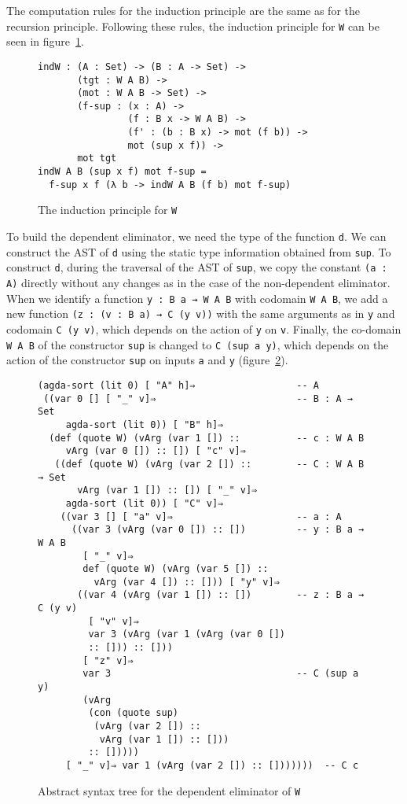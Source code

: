 \documentclass[sigplan,10pt]{acmart}
\begin{document}
The computation rules for the induction principle are the same as for the recursion principle.
Following these rules, the induction principle for \texttt{W} can be seen in figure~\ref{fig:w-ind}.

\begin{figure}
\begin{Verbatim}
indW : (A : Set) -> (B : A -> Set) ->
       (tgt : W A B) ->
       (mot : W A B -> Set) ->
       (f-sup : (x : A) ->
                (f : B x -> W A B) ->
                (f' : (b : B x) -> mot (f b)) ->
                mot (sup x f)) ->
       mot tgt
indW A B (sup x f) mot f-sup =
  f-sup x f (λ b -> indW A B (f b) mot f-sup)
\end{Verbatim}
  \caption{The induction principle for \texttt{W}}
  \label{fig:w-ind}
\end{figure}

To build the dependent eliminator, we need the type of the function {\tt d}. We can construct the AST of {\tt d} using the static type information obtained from {\tt sup}. To construct {\tt d}, during the traversal of the AST of {\tt sup}, we copy the constant {\tt (a : A)} directly without any changes as in the case of the non-dependent eliminator. When we identify a function {\tt y : B a → W A B} with codomain {\tt W A B}, we add a new function {\tt (z : (v : B a) → C (y v))} with the same arguments as in {\tt y} and codomain {\tt C (y v)}, which depends on the action of {\tt y} on {\tt v}. Finally, the co-domain \texttt{W A B} of the constructor {\tt sup} is changed to {\tt C (sup a y)}, which depends on the action of the constructor {\tt sup} on inputs {\tt a} and {\tt y} (figure~\ref{fig:ast-d'}).

\begin{figure}
\begin{center}
\begingroup
\fontsize{7pt}{9pt}\selectfont
\begin{Verbatim}
(agda-sort (lit 0) [ "A" h]⇒                  -- A
 ((var 0 [] [ "_" v]⇒                         -- B : A → Set
     agda-sort (lit 0)) [ "B" h]⇒
  (def (quote W) (vArg (var 1 []) ::          -- c : W A B
     vArg (var 0 []) :: []) [ "c" v]⇒
   ((def (quote W) (vArg (var 2 []) ::        -- C : W A B → Set
       vArg (var 1 []) :: []) [ "_" v]⇒
     agda-sort (lit 0)) [ "C" v]⇒
    ((var 3 [] [ "a" v]⇒                      -- a : A
      ((var 3 (vArg (var 0 []) :: [])         -- y : B a → W A B
        [ "_" v]⇒
        def (quote W) (vArg (var 5 []) :: 
          vArg (var 4 []) :: [])) [ "y" v]⇒
       ((var 4 (vArg (var 1 []) :: [])        -- z : B a → C (y v)
         [ "v" v]⇒
         var 3 (vArg (var 1 (vArg (var 0 []) 
         :: [])) :: []))
        [ "z" v]⇒
        var 3                                 -- C (sup a y)
        (vArg
         (con (quote sup)
          (vArg (var 2 []) :: 
           vArg (var 1 []) :: []))
         :: []))))
     [ "_" v]⇒ var 1 (vArg (var 2 []) :: []))))))  -- C c
\end{Verbatim}
\endgroup
\end{center}
\caption{Abstract syntax tree for the dependent eliminator of {\tt W}}
\label{fig:ast-d'}
\end{figure}
\normalsize
\end{document}
